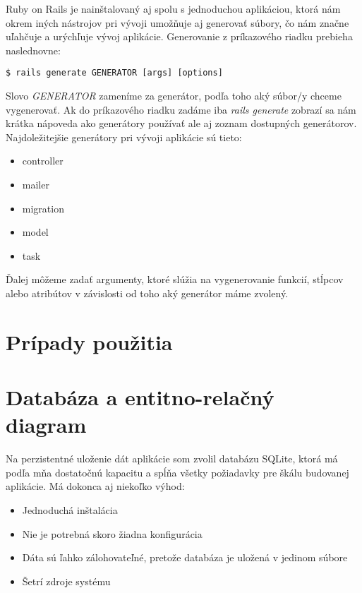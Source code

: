 Ruby on Rails je nainštalovaný aj spolu s jednoduchou aplikáciou, ktorá nám okrem iných nástrojov pri vývoji umožňuje aj generovať súbory, čo nám značne uľahčuje a urýchľuje vývoj aplikácie. Generovanie z príkazového riadku prebieha naslednovne:

\begin{verbatim}
$ rails generate GENERATOR [args] [options]
\end{verbatim}

Slovo \emph{GENERATOR} zameníme za generátor, podľa toho aký súbor/y chceme vygenerovať. Ak do príkazového riadku zadáme iba \emph{rails generate} zobrazí sa nám krátka nápoveda ako generátory používať ale aj zoznam dostupných generátorov. Najdoležitejšie generátory pri vývoji aplikácie sú tieto:

\begin{itemize}
  \item controller
  \item mailer
  \item migration
  \item model
  \item task
\end{itemize}

Ďalej môžeme zadať argumenty, ktoré slúžia na vygenerovanie funkcií, stĺpcov alebo atribútov v závislosti od toho aký generátor máme zvolený.


\section{Prípady použitia}



\section{Databáza a entitno-relačný diagram}

Na perzistentné uloženie dát aplikácie som zvolil databázu SQLite, ktorá má podľa mňa dostatočnú kapacitu a spĺňa všetky požiadavky pre škálu budovanej aplikácie. Má dokonca aj niekoľko výhod:

\begin{itemize}
    \item Jednoduchá inštalácia
    \item Nie je potrebná skoro žiadna konfigurácia
    \item Dáta sú ľahko zálohovateľné, pretože databáza je uložená v jedinom súbore
    \item Šetrí zdroje systému
\end{itemize}

